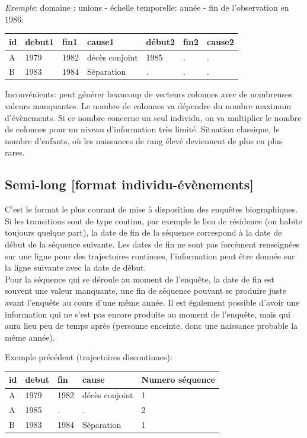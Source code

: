 \documentclass[
  12pt,
  letterpaper,
  DIV=11,
  numbers=noendperiod,
  onepage,
  openany]{scrreprt}
\begin{document}
\emph{Exemple}: domaine : unions - échelle temporelle: année - fin de
l'observation en 1986:

\begin{longtable}[]{@{}lllllll@{}}
\toprule\noalign{}
id & debut1 & fin1 & cause1 & début2 & fin2 & cause2 \\
\midrule\noalign{}
\endhead
\bottomrule\noalign{}
\endlastfoot
A & 1979 & 1982 & décès conjoint & 1985 & . & . \\
B & 1983 & 1984 & Séparation & . & . & . \\
\end{longtable}

Inconvénients: peut générer beaucoup de vecteurs colonnes avec de
nombreuses valeurs manquantes. Le nombre de colonnes va dépendre du
nombre maximum d'évènements. Si ce nombre concerne un seul individu, on
va multiplier le nombre de colonnes pour un niveau d'information très
limité. Situation classique, le nombre d'enfants, où les naissances de
rang élevé deviennent de plus en plus rares.

\hypertarget{semi-long-format-individu-uxe9vuxe8nements}{%
\subsection{Semi-long {[}format
individu-évènements{]}}\label{semi-long-format-individu-uxe9vuxe8nements}}

C'est le format le plus courant de mise à disposition des enquêtes
biographiques. Si les transitions sont de type continu, par exemple le
lieu de résidence (on habite toujours quelque part), la date de fin de
la séquence correspond à la date de début de la séquence suivante. Les
dates de fin ne sont pas forcément renseignées sur une ligne pour des
trajectoires continues, l'information peut être donnée sur la ligne
suivante avec la date de début.\\
Pour la séquence qui se déroule au moment de l'enquête, la date de fin
est souvent une valeur manquante, une fin de séquence pouvant se
produire juste avant l'enquête au cours d'une même année. Il est
également possible d'avoir une information qui ne s'est pas encore
produite au moment de l'enquête, mais qui aura lieu peu de temps après
(personne enceinte, donc une naissance probable la même année).

Exemple précédent (trajectoires discontinues):

\begin{longtable}[]{@{}lllll@{}}
\toprule\noalign{}
id & debut & fin & cause & Numero séquence \\
\midrule\noalign{}
\endhead
\bottomrule\noalign{}
\endlastfoot
A & 1979 & 1982 & décès conjoint & 1 \\
A & 1985 & . & . & 2 \\
B & 1983 & 1984 & Séparation & 1 \\
\end{longtable}
\end{document}
